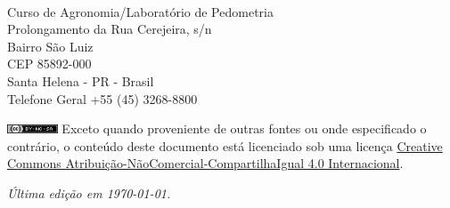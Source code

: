 \newpage
\nopagecolor
\begin{fullwidth}
~\vfill
\thispagestyle{empty}
\setlength{\parindent}{0pt}
\setlength{\parskip}{\baselineskip}

\par{}

\par{
  Curso de Agronomia/Laboratório de Pedometria\\
  Prolongamento da Rua Cerejeira, s/n\\
  Bairro São Luiz\\
  CEP 85892-000\\
  Santa Helena - PR - Brasil\\
  Telefone Geral +55 (45) 3268-8800
}

\par{}

\par\includegraphics[width=1.5cm]{img/cc-by-nc-sa.png} Exceto quando proveniente de outras fontes ou onde especificado o contrário, o conteúdo deste documento está licenciado sob uma licença \href{http://creativecommons.org/licenses/by-nc-sa/4.0/}{Creative Commons Atribuição-NãoComercial-CompartilhaIgual 4.0 Internacional}.

\par\textit{Última edição em \today.}
\end{fullwidth}
